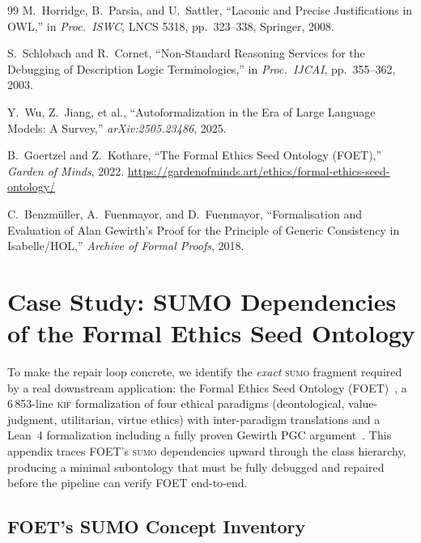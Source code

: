 \documentclass[11pt]{article}
\newcommand{\KIF}{\textsc{kif}}
\newcommand{\SUMO}{\textsc{sumo}}
\theoremstyle{definition}
\theoremstyle{plain}
\begin{document}
\begin{thebibliography}{99}
M.~Horridge, B.~Parsia, and U.~Sattler,
``Laconic and Precise Justifications in OWL,''
in \textit{Proc.\ ISWC}, LNCS 5318, pp.~323--338, Springer, 2008.

S.~Schlobach and R.~Cornet,
``Non-Standard Reasoning Services for the Debugging of Description
Logic Terminologies,''
in \textit{Proc.\ IJCAI}, pp.~355--362, 2003.

Y.~Wu, Z.~Jiang, et al.,
``Autoformalization in the Era of Large Language Models: A Survey,''
\textit{arXiv:2505.23486}, 2025.

B.~Goertzel and Z.~Kothare,
``The Formal Ethics Seed Ontology (FOET),''
\textit{Garden of Minds}, 2022.
\url{https://gardenofminds.art/ethics/formal-ethics-seed-ontology/}

C.~Benzm\"uller, A.~Fuenmayor, and D.~Fuenmayor,
``Formalisation and Evaluation of Alan Gewirth's Proof for the
Principle of Generic Consistency in Isabelle/HOL,''
\textit{Archive of Formal Proofs}, 2018.

\end{thebibliography}

\appendix

\section{Case Study: SUMO Dependencies of the Formal Ethics Seed Ontology}
\label{app:foet}

To make the repair loop concrete, we identify the \emph{exact} \SUMO{}
fragment required by a real downstream application: the Formal Ethics
Seed Ontology (FOET)~\cite{foet2022}, a 6\,853-line \KIF{}
formalization of four ethical paradigms (deontological, value-judgment,
utilitarian, virtue ethics) with inter-paradigm translations and a
Lean~4 formalization including a fully proven Gewirth PGC
argument~\cite{benzmuller-gewirth}.
This appendix traces FOET's \SUMO{} dependencies upward through the
class hierarchy, producing a minimal subontology that must be fully
debugged and repaired before the pipeline can verify FOET end-to-end.

\subsection{FOET's SUMO Concept Inventory}
\end{document}
